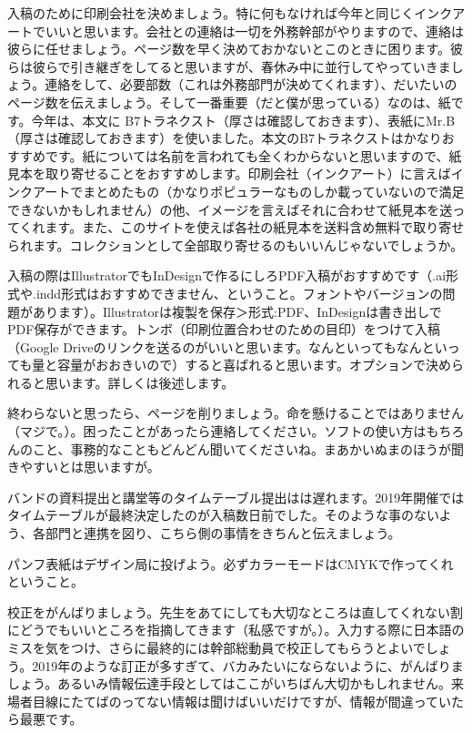 \documentclass[dvipdfmx,jb5]{jarticle}
\begin{document}
入稿のために印刷会社を決めましょう。特に何もなければ今年と同じくインクアートでいいと思います。会社との連絡は一切を外務幹部がやりますので、連絡は彼らに任せましょう。ページ数を早く決めておかないとこのときに困ります。彼らは彼らで引き継ぎをしてると思いますが、春休み中に並行してやっていきましょう。連絡をして、必要部数（これは外務部門が決めてくれます）、だいたいのページ数を伝えましょう。そして一番重要（だと僕が思っている）なのは、紙です。今年は、本文に B7トラネクスト（厚さは確認しておきます）、表紙にMr.B（厚さは確認しておきます）を使いました。本文のB7トラネクストはかなりおすすめです。紙については名前を言われても全くわからないと思いますので、紙見本を取り寄せることをおすすめします。印刷会社（インクアート）に言えばインクアートでまとめたもの（かなりポピュラーなものしか載っていないので満足できないかもしれません）の他、イメージを言えばそれに合わせて紙見本を送ってくれます。また、このサイトを使えば各社の紙見本を送料含め無料で取り寄せられます。コレクションとして全部取り寄せるのもいいんじゃないでしょうか。

入稿の際はIllustratorでもInDesignで作るにしろPDF入稿がおすすめです（.ai形式や.indd形式はおすすめできません、ということ。フォントやバージョンの問題があります）。Illustratorは複製を保存＞形式:PDF、InDesignは書き出しでPDF保存ができます。トンボ（印刷位置合わせのための目印）をつけて入稿（Google Driveのリンクを送るのがいいと思います。なんといってもなんといっても量と容量がおおきいので）すると喜ばれると思います。オプションで決められると思います。詳しくは後述します。

終わらないと思ったら、ページを削りましょう。命を懸けることではありません（マジで。）。困ったことがあったら連絡してください。ソフトの使い方はもちろんのこと、事務的なこともどんどん聞いてくださいね。まあかいぬまのほうが聞きやすいとは思いますが。

バンドの資料提出と講堂等のタイムテーブル提出はは遅れます。2019年開催ではタイムテーブルが最終決定したのが入稿数日前でした。そのような事のないよう、各部門と連携を図り、こちら側の事情をきちんと伝えましょう。

パンフ表紙はデザイン局に投げよう。必ずカラーモードはCMYKで作ってくれということ。

校正をがんばりましょう。先生をあてにしても大切なところは直してくれない割にどうでもいいところを指摘してきます（私感ですが。）。入力する際に日本語のミスを気をつけ、さらに最終的には幹部総動員で校正してもらうとよいでしょう。2019年のような訂正が多すぎて、バカみたいにならないように、がんばりましょう。あるいみ情報伝達手段としてはここがいちばん大切かもしれません。来場者目線にたてばのってない情報は聞けばいいだけですが、情報が間違っていたら最悪です。
\end{document}
